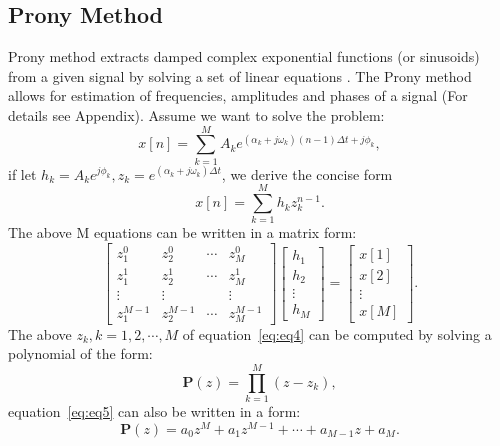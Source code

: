 \subsection{Prony Method}
Prony method extracts damped complex exponential functions (or sinusoids) 
from a given signal by solving a set of linear equations 
\cite[]{prony,prony2003,ThomasPeter2013,Mitrofanov2015}. 
The Prony method allows for estimation of frequencies, amplitudes and phases 
of a signal (For details see Appendix). Assume we want to solve the problem:
\begin{equation}
    \label{eq:eq2}
     x[n] = \sum_{k=1}^{M}A_k e^{(\alpha_k + j\omega_k)(n-1)\Delta t + j\phi_k},
\end{equation}
if let $h_k = A_k e^{j\phi_k}, z_k = e^{(\alpha_k + j\omega_k)\Delta t}$, we derive the concise form
\begin{equation}
    \label{eq:eq3}
     x[n] = \sum_{k=1}^{M}h_k z_k^{n-1}.
\end{equation}
The above M equations can be written in a matrix form:
\begin{equation}
    \label{eq:eq4}
    \left[ \begin{array}{cccc}
        z_1^0 & z_2^0 & \cdots & z_M^0\\
        z_1^1 & z_2^1 & \cdots & z_M^1\\
        \vdots & \vdots & & \vdots\\
        z_1^{M-1} & z_2^{M-1} & \cdots & z_M^{M-1}
    \end{array} \right]
    \left[ \begin{array}{c} h_1\\ h_2\\ \vdots \\ h_M
    \end{array} \right] =
    \left[ \begin{array}{c} x[1]\\ x[2]\\ \vdots \\ x[M]
    \end{array} \right].
\end{equation}
The above $z_k, k=1,2, \cdots , M$ of equation~\ref{eq:eq4} 
can be computed by solving a polynomial of the form:
\begin{equation}
    \label{eq:eq5}
    \mathbf{P}(z)  = \prod_{k=1}^{M}(z-z_k),
\end{equation}
equation~\ref{eq:eq5} can also be written in a form:
\begin{equation}
    \label{eq:eq6}
    \mathbf{P}(z) = a_0 z^M + a_1 z^{M-1} + \cdots + a_{M-1}z + a_M.
\end{equation}

